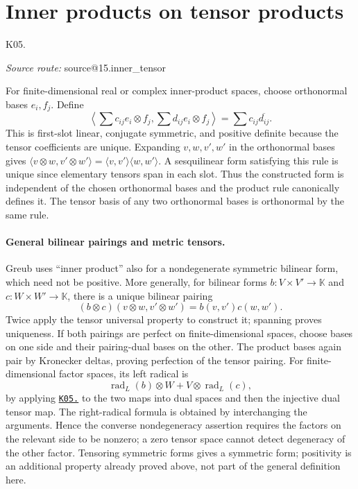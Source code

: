 \documentclass[11pt,a4paper]{book}
\makeatletter
\theoremstyle{definition}\newtheorem{definition}[theorem]{Definition}
\theoremstyle{remark}\newtheorem{remark}[theorem]{Remark}
\newcommand{\K}{\mathbb K}\newcommand{\R}{\mathbb R}\newcommand{\C}{\mathbb C}
\newcommand{\ip}[2]{\langle #1,#2\rangle}
\newcommand{\kref}[1]{\hyperref[k:#1]{\texttt{K05.\detokenize{#1}}}}
\newcommand{\Kentry}[2]{\section{#2}\label{k:#1}\noindent\textsf{\small K05.\detokenize{#1}}\par
  \begingroup\small\color{black!65}\textit{Source route: }\csname source@#1\endcsname\par\endgroup}
\makeatother
\begin{document}
\Kentry{15.inner_tensor}{Inner products on tensor products}
For finite-dimensional real or complex inner-product spaces, choose orthonormal bases $e_i,f_j$. Define
\[
 \left\langle\sum c_{ij}e_i\otimes f_j,\sum d_{ij}e_i\otimes f_j\right\rangle
 =\sum c_{ij}\overline{d_{ij}}.
\]
This is first-slot linear, conjugate symmetric, and positive definite because the tensor coefficients are unique. Expanding $v,w,v',w'$ in the orthonormal bases gives $\ip{v\otimes w}{v'\otimes w'}=\ip v{v'}\ip w{w'}$. A sesquilinear form satisfying this rule is unique since elementary tensors span in each slot. Thus the constructed form is independent of the chosen orthonormal bases and the product rule canonically defines it. The tensor basis of any two orthonormal bases is orthonormal by the same rule.


\paragraph{General bilinear pairings and metric tensors.}
Greub uses ``inner product'' also for a nondegenerate symmetric bilinear form, which need not be positive. More generally, for bilinear forms $b:V\times V'\to\K$ and $c:W\times W'\to\K$, there is a unique bilinear pairing
\[
 (b\otimes c)(v\otimes w,v'\otimes w')=b(v,v')c(w,w').
\]
Twice apply the tensor universal property to construct it; spanning proves uniqueness. If both pairings are perfect on finite-dimensional spaces, choose bases on one side and their pairing-dual bases on the other. The product bases again pair by Kronecker deltas, proving perfection of the tensor pairing. For finite-dimensional factor spaces, its left radical is
\[
 \operatorname{rad}_L(b)\otimes W+V\otimes\operatorname{rad}_L(c),
\]
by applying \kref{15.tensor_kernel} to the two maps into dual spaces and then the injective dual tensor map. The right-radical formula is obtained by interchanging the arguments. Hence the converse nondegeneracy assertion requires the factors on the relevant side to be nonzero; a zero tensor space cannot detect degeneracy of the other factor. Tensoring symmetric forms gives a symmetric form; positivity is an additional property already proved above, not part of the general definition here.
\end{document}

